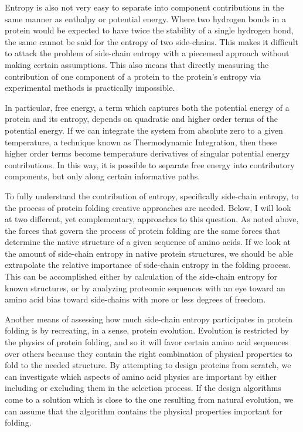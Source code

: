 Entropy is also not very easy to separate into component contributions in the same manner as enthalpy or potential energy\cite{Brady:1997p318}. Where two hydrogen bonds in a protein would be expected to have twice the stability of a single hydrogen bond, the same cannot be said for the entropy of two side-chains. This makes it difficult to attack the problem of side-chain entropy with a piecemeal approach without making certain assumptions. This also means that directly measuring the contribution of one component of a protein to the protein's entropy via experimental methods is practically impossible.

In particular, free energy, a term which captures both the potential energy of a protein and its entropy, depends on quadratic and higher order terms of the potential energy\cite{Brady:1996p394}. If we can integrate the system from absolute zero to a given temperature, a technique known as Thermodynamic Integration, then these higher order terms become temperature derivatives of singular potential energy contributions. In this way, it is possible to separate free energy into contributory components, but only along certain informative paths.

To fully understand the contribution of entropy, specifically side-chain entropy, to the process of protein folding creative approaches are needed. Below, I will look at two different, yet complementary, approaches to this question. As noted above, the forces that govern the process of protein folding are the same forces that determine the native structure of a given sequence of amino acids. If we look at the amount of side-chain entropy in native protein structures, we should be able extrapolate the relative importance of side-chain entropy in the folding process. This can be accomplished either by calculation of the side-chain entropy for known structures, or by analyzing proteomic sequences with an eye toward an amino acid bias toward side-chains with more or less degrees of freedom.

Another means of assessing how much side-chain entropy participates in protein folding is by recreating, in a sense, protein evolution. Evolution is restricted by the physics of protein folding, and so it will favor certain amino acid sequences over others because they contain the right combination of physical properties to fold to the needed structure. By attempting to design proteins from scratch, we can investigate which aspects of amino acid physics are important by either including or excluding them in the selection process. If the design algorithms come to a solution which is close to the one resulting from natural evolution, we can assume that the algorithm contains the physical properties important for folding.